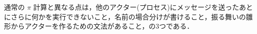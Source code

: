 

通常の $\pi$ 計算と異なる点は，他のアクター(プロセス)にメッセージを送ったあとにさらに何かを実行できないこと，名前の場合分けが書けること，振る舞いの雛形からアクターを作るための文法があること，の3つである．



